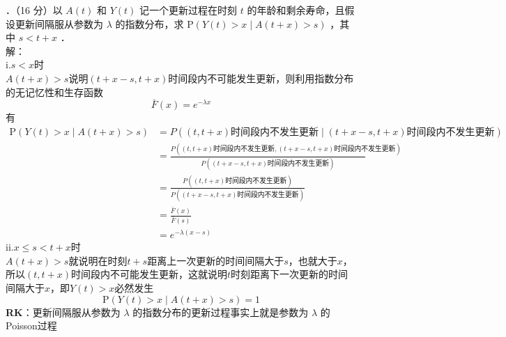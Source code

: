 \documentclass[UTF8]{ctexart}
\begin{document}
．（16 分）以 $A(t)$ 和 $Y(t)$ 记一个更新过程在时刻 $t$ 的年龄和剩余寿命，且假设更新间隔服从参数为 $\lambda$ 的指数分布，求 $\mathrm{P}(Y(t)>x \mid A(t+x)>s)$ ，其中 $s<t+x$ ．\\
解：\\
i.$s<x$时\\
$A(t+x)>s$说明$(t+x-s,t+x)$时间段内不可能发生更新，则利用指数分布的无记忆性和生存函数$$\bar{F}(x)=e^{-\lambda x}$$
有
\begin{align*}
	\mathrm{P}(Y(t)>x \mid A(t+x)>s) & =P\left( (t,t+x)\text{时间段内不发生更新}\mid (t+x-s,t+x)\text{时间段内不发生更新}\right)  \\
	& = \frac{ P\left( (t,t+x)\text{时间段内不发生更新}, (t+x-s,t+x)\text{时间段内不发生更新}\right)}{ P\left(  (t+x-s,t+x)\text{时间段内不发生更新}\right)}\\
	&=\frac{ P\left( (t,t+x)\text{时间段内不发生更新}\right)}{ P\left(  (t+x-s,t+x)\text{时间段内不发生更新}\right)}\\
	&=\frac{\bar{F}(x)}{\bar{F}(s)}\\
	&=e^{-\lambda (x-s)}
\end{align*}
ii.$x\le s<t+x$时\\
$A(t+x)>s$就说明在时刻$t+s$距离上一次更新的时间间隔大于$s$，也就大于$x$，所以$(t,t+x)$时间段内不可能发生更新，这就说明$t$时刻距离下一次更新的时间间隔大于$x$，即$Y(t)>x$必然发生
\[
\mathrm{P}(Y(t)>x \mid A(t+x)>s)=1
\]
\textbf{RK}：更新间隔服从参数为 $\lambda$ 的指数分布的更新过程事实上就是参数为 $\lambda$ 的Poisson过程\\
\end{document}
